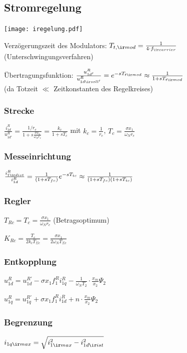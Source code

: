 \documentclass[german]{latex4ei_fs}
\begin{document}
\begin{sectionbox}
\subsection{Stromregelung}
\texttt{[image: iregelung.pdf]}

Verzögerungszeit des Modulators: $T_{t, \ir mod} = \frac{1}{4 \cdot f_{\ir carrier}}$ (Unterschwingungsverfahren)

Übertragungsfunktion: $\frac{u_{1d'}^R}{u_{1d \ir soll'}^R} = e^{- s T_{t \ir mod}} \approx \frac{1}{1 + s T_{t \ir mod}}$\\
(da Totzeit $\ll$ Zeitkonstanten des Regelkreises)

\subsubsection*{Strecke} $\frac{i_{1d}^R}{u_{1d'}^R} = \frac{1 / r_e}{1 + s \frac{\sigma x_1}{\omega_N r_e}} = \frac{k_c}{1 + sT_c}$ mit $k_c = \frac{1}{r_e}$, $T_c = \frac{\sigma x_1}{\omega_N r_e}$

\subsubsection*{Messeinrichtung}
$\frac{i_{1 \ir dist}^R}{i_{1d}^R} = \frac{1}{(1 + s T_{fc})} e^{-s T_{tc}} \approx \frac{1}{(1 + s T_{fc}) (1 + s T_{tc})}$ 

\subsubsection*{Regler}

$T_{Rc} = T_c  = \frac{\sigma x_1}{\omega_N r_e}$ (Betragsoptimum)

$K_{Rc} = \frac{T_c}{2 k_c T_{\Sigma c}} = \frac{\sigma x_1}{2 \omega_N T_{\Sigma c}}$ 

\subsubsection*{Entkopplung}

$u_{1d}^R = u_{1d}^{R'} - \sigma x_1 f_1^R i_{1q}^R - \frac{1}{\omega_N T_2} \cdot \frac{x_m}{x_2} \Psi_2$

$u_{1q}^R = u_{1q}^{R '} + \sigma x_1 f_1^R i_{1d}^R + n \cdot \frac{x_m}{x_2} \Psi_2$ 

\subsubsection*{Begrenzung}

$i_{1q \ir max} = \sqrt{i_{1\ir max}^2 - i_{1d \ir ist}^2} $ 
\end{sectionbox}
\end{document}
